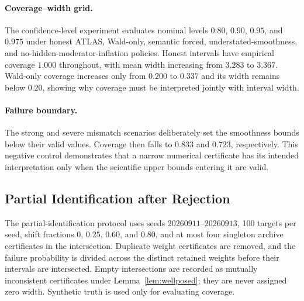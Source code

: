 \documentclass[11pt]{article}
\numberwithin{equation}{section}
\newcommand{\1}{\mathbf 1}
\begin{document}


\paragraph{Coverage--width grid.}
The confidence-level experiment evaluates nominal levels $0.80$, $0.90$, $0.95$, and $0.975$ under honest ATLAS, Wald-only, semantic forced, understated-smoothness, and no-hidden-moderator-inflation policies.  Honest intervals have empirical coverage $1.000$ throughout, with mean width increasing from $3.283$ to $3.367$.  Wald-only coverage increases only from $0.200$ to $0.337$ and its width remains below $0.20$, showing why coverage must be interpreted jointly with interval width.



\paragraph{Failure boundary.}
The strong and severe mismatch scenarios deliberately set the smoothness bounds below their valid values.  Coverage then falls to $0.833$ and $0.723$, respectively.  This negative control demonstrates that a narrow numerical certificate has its intended interpretation only when the scientific upper bounds entering it are valid.




\subsection{Partial Identification after Rejection}
\label{app:partial-identification}
\suppressfloats[t]

The partial-identification protocol uses seeds $20260911$--$20260913$, 100 targets per seed, shift fractions $0$, $0.25$, $0.60$, and $0.80$, and at most four singleton archive certificates in the intersection.  Duplicate weight certificates are removed, and the failure probability is divided across the distinct retained weights before their intervals are intersected.  Empty intersections are recorded as mutually inconsistent certificates under Lemma~\ref{lem:wellposed}; they are never assigned zero width.  Synthetic truth is used only for evaluating coverage.


\end{document}
